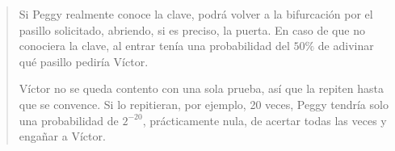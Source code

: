 \begin{quote}
Si Peggy realmente conoce la clave, podrá volver a la bifurcación por el pasillo solicitado, abriendo, si es preciso, la puerta.
En caso de que no conociera la clave, al entrar tenía una probabilidad del $50\%$ de adivinar qué pasillo pediría Víctor.



Víctor no se queda contento con una sola prueba, así que la repiten hasta que se convence. Si lo repitieran, por ejemplo, 20 veces, Peggy tendría solo una probabilidad de $2^{-20}$, prácticamente nula, de acertar todas las veces y engañar a Víctor.



\end{quote}
